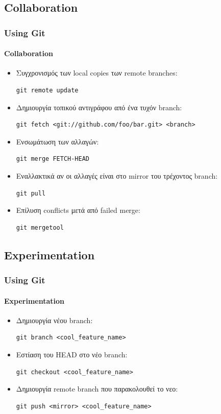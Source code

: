 \documentclass[handout]{beamer}
\begin{document}
\subsection{Collaboration}

\begin{frame}[fragile]
  \frametitle{Using Git}
  \framesubtitle{Collaboration}
  \begin{itemize}
    \item Συγχρονισμός των local copies των remote branches:
\begin{verbatim}
git remote update
\end{verbatim}
    \item Δημιουργία τοπικού αντιγράφου από ένα τυχόν branch:
\begin{verbatim}
git fetch <git://github.com/foo/bar.git> <branch>
\end{verbatim}
    \item Ενσωμάτωση των αλλαγών:
\begin{verbatim}
git merge FETCH-HEAD
\end{verbatim}
    \item Εναλλακτικά αν οι αλλαγές είναι στο mirror του τρέχοντος branch:
\begin{verbatim}
git pull
\end{verbatim}
    \item Επίλυση conflicts μετά από failed merge:
\begin{verbatim}
git mergetool
\end{verbatim}
  \end{itemize}
\end{frame}

\subsection{Experimentation}

\begin{frame}[fragile]
  \frametitle{Using Git}
  \framesubtitle{Experimentation}
  \begin{itemize}
    \item Δημιουργία νέου branch:
\begin{verbatim}
git branch <cool_feature_name>
\end{verbatim}
    \item Εστίαση του HEAD στο νέο branch:
\begin{verbatim}
git checkout <cool_feature_name>
\end{verbatim}
    \item Δημιουργία remote branch που παρακολουθεί το νεο:
\begin{verbatim}
git push <mirror> <cool_feature_name>
\end{verbatim}
  \end{itemize}
\end{frame}
\end{document}
